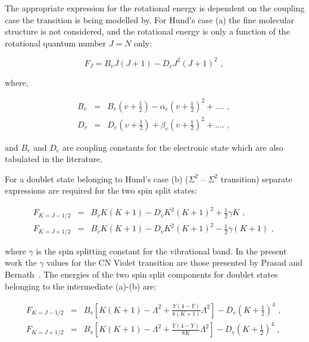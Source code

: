\par

The appropriate expression for the rotational energy is dependent on the coupling case the transition is being modelled by.
For Hund's case (a) the fine molecular structure is not considered, and the rotational energy is only a function of the rotational quantum number $J=N$ only:

\begin{equation}
 F_J = B_v J ( J + 1 ) - D_v J^2 ( J + 1 )^2 \text{ , } \label{eq:F_J_HundA}
\end{equation}

\noindent where,

\begin{eqnarray}
 B_v &=& B_e ( v + \frac{1}{2} ) - \alpha_e ( v + \frac{1}{2} )^2 + .... \text{ , } \label{eq:B_v} \\
 D_v &=& D_e ( v + \frac{1}{2} ) + \beta_e ( v + \frac{1}{2} )^2 + .... \text{ , } \label{eq:D_v}
\end{eqnarray}

\noindent and $B_e$ and $D_e$ are coupling constants for the electronic state which are also tabulated in the literature.

\par

For a doublet state belonging to Hund's case (b) ($\Sigma^2$ -- $\Sigma^2$ transition) separate expressions are required for the two spin split states:

\begin{eqnarray}
 F_{K=J-1/2} &=& B_v K ( K + 1 ) - D_v K^2 ( K + 1 )^2 + \frac{1}{2} \gamma K  \text{ , } \label{eq:F_K_1_HundB} \\
 F_{K=J+1/2} &=& B_v K ( K + 1 ) - D_v K^2 ( K + 1 )^2 - \frac{1}{2} \gamma \left ( K + 1 \right )  \text{ , } \label{eq:F_K_2_HundB}
\end{eqnarray}

\noindent where $\gamma$ is the spin splitting constant for the vibrational band.
In the present work the $\gamma$ values for the CN Violet transition are those presented by Prasad and Bernath~\cite{PB1992}.
The energies of the two spin split components for doublet states belonging to the intermediate (a)-(b) are:

\begin{eqnarray}
 F_{K=J-1/2} &=& B_v \left [ K ( K + 1 ) - \Lambda^2 + \frac{Y \left ( 4 - Y \right )}{8 ( K + 1 )} \Lambda^2 \right ] - D_v ( K + \frac{1}{2} )^4  \text{ , } \label{eq:F_K_1_HundAB} \\
 F_{K=J+1/2} &=& B_v \left [ K ( K + 1 ) - \Lambda^2 + \frac{Y \left ( 4 - Y \right )}{8 K} \Lambda^2 \right ] - D_v ( K + \frac{1}{2} )^4  \text{ , } \label{eq:F_K_2_HundAB}
\end{eqnarray}

